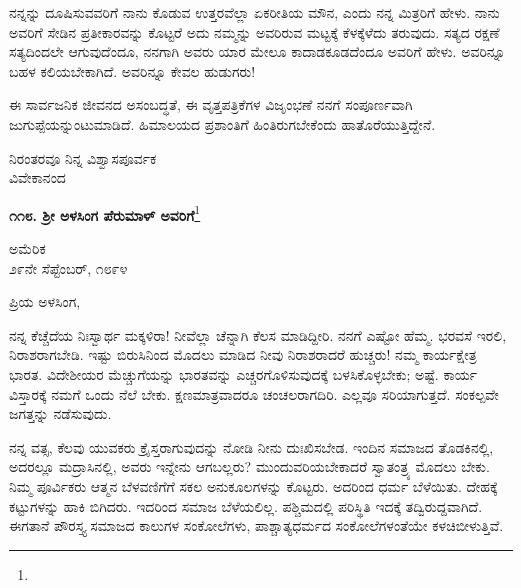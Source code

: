 ನನ್ನನ್ನು ದೂಷಿಸುವವರಿಗೆ ನಾನು ಕೊಡುವ ಉತ್ತರವೆಲ್ಲಾ ಏಕರೀತಿಯ ಮೌನ, ಎಂದು ನನ್ನ ಮಿತ್ರರಿಗೆ ಹೇಳು. ನಾನು ಅವರಿಗೆ ಸೇಡಿನ ಪ್ರತೀಕಾರವನ್ನು ಕೊಟ್ಟರೆ ಅದು ನಮ್ಮನ್ನು ಅವರಿರುವ ಮಟ್ಟಕ್ಕೆ ಕೆಳಕ್ಕೆಳೆದು ತರುವುದು. ಸತ್ಯದ ರಕ್ಷಣೆ ಸತ್ಯದಿಂದಲೇ ಆಗುವುದೆಂದೂ, ನನಗಾಗಿ ಅವರು ಯಾರ ಮೇಲೂ ಕಾದಾಡಕೂಡದೆಂದೂ ಅವರಿಗೆ ಹೇಳು. ಅವರಿನ್ನೂ ಬಹಳ ಕಲಿಯಬೇಕಾಗಿದೆ. ಅವರಿನ್ನೂ ಕೇವಲ ಹುಡುಗರು!

ಈ ಸಾರ್ವಜನಿಕ ಜೀವನದ ಅಸಂಬದ್ಧತೆ, ಈ ವೃತ್ತಪತ್ರಿಕೆಗಳ ವಿಜೃಂಭಣೆ ನನಗೆ ಸಂಪೂರ್ಣವಾಗಿ ಜುಗುಪ್ಪೆಯನ್ನುಂಟುಮಾಡಿದೆ. ಹಿಮಾಲಯದ ಪ್ರಶಾಂತಿಗೆ ಹಿಂತಿರುಗಬೇಕೆಂದು ಹಾತೊರೆಯುತ್ತಿದ್ದೇನೆ.

\vspace{-0.5cm}

{\flushright
ನಿರಂತರವೂ ನಿನ್ನ ವಿಶ್ವಾಸಪೂರ್ವಕ\\ವಿವೇಕಾನಂದ\par}

\begin{center}
\textbf{೧೧೮. ಶ‍್ರೀ ಅಳಸಿಂಗ ಪೆರುಮಾಳ್ ಅವರಿಗೆ}\footnote{}
\end{center}

\vspace{-0.5cm}

\begin{flushright}
ಅಮೆರಿಕ\\೨೯ನೇ ಸೆಪ್ಟೆಂಬರ್, ೧೮೯೪
\end{flushright}

\vspace{-0.5cm}

\noindent
ಪ್ರಿಯ ಅಳಸಿಂಗ,

ನನ್ನ ಕೆಚ್ಚೆದೆಯ ನಿಃಸ್ವಾರ್ಥ ಮಕ್ಕಳಿರಾ! ನೀವೆಲ್ಲಾ ಚೆನ್ನಾಗಿ ಕೆಲಸ ಮಾಡಿದ್ದೀರಿ. ನನಗೆ ಎಷ್ಟೋ ಹೆಮ್ಮ. ಭರವಸೆ ಇರಲಿ, ನಿರಾಶರಾಗಬೇಡಿ. ಇಷ್ಟು ಬಿರುಸಿನಿಂದ ಮೊದಲು ಮಾಡಿದ ನೀವು ನಿರಾಶರಾದರೆ ಹುಚ್ಚರು! ನಮ್ಮ ಕಾರ್ಯಕ್ಷೇತ್ರ ಭಾರತ. ವಿದೇಶೀಯರ ಮೆಚ್ಚುಗೆಯನ್ನು ಭಾರತವನ್ನು ಎಚ್ಚರಗೊಳಿಸುವುದಕ್ಕೆ ಬಳಸಿಕೊಳ್ಳಬೇಕು; ಅಷ್ಟೆ. ಕಾರ್ಯ ವಿಸ್ತಾರಕ್ಕೆ ನಮಗೆ ಒಂದು ನೆಲೆ ಬೇಕು. ಕ್ಷಣಮಾತ್ರವಾದರೂ ಚಂಚಲರಾಗದಿರಿ. ಎಲ್ಲವೂ ಸರಿಯಾಗುತ್ತದೆ. ಸಂಕಲ್ಪವೇ ಜಗತ್ತನ್ನು ನಡೆಸುವುದು.

ನನ್ನ ವತ್ಸ, ಕೆಲವು ಯುವಕರು ಕ್ರೈಸ್ತರಾಗುವುದನ್ನು ನೋಡಿ ನೀನು ದುಃಖಿಸಬೇಡ. ಇಂದಿನ ಸಮಾಜದ ತೊಡಕಿನಲ್ಲಿ, ಅದರಲ್ಲೂ ಮದ್ರಾಸಿನಲ್ಲಿ, ಅವರು ಇನ್ನೇನು ಆಗಬಲ್ಲರು? ಮುಂದುವರಿಯಬೇಕಾದರೆ ಸ್ವಾತಂತ್ರ್ಯ ಮೊದಲು ಬೇಕು. ನಿಮ್ಮ ಪೂರ್ವಿಕರು ಆತ್ಮನ ಬೆಳವಣಿಗೆಗೆ ಸಕಲ ಅನುಕೂಲಗಳನ್ನು ಕೊಟ್ಟರು. ಅದರಿಂದ ಧರ್ಮ ಬೆಳೆಯಿತು. ದೇಹಕ್ಕೆ ಕಟ್ಟುಗಳನ್ನು ಹಾಕಿ ಬಿಗಿದರು. ಇದರಿಂದ ಸಮಾಜ ಬೆಳೆಯಲಿಲ್ಲ. ಪಶ್ಚಿಮದಲ್ಲಿ ಪರಿಸ್ಥಿತಿ ಇದಕ್ಕೆ ತದ್ವಿರುದ್ದವಾಗಿದೆ. ಈಗತಾನೆ ಪೌರಸ್ತ್ಯ ಸಮಾಜದ ಕಾಲುಗಳ ಸಂಕೋಲೆಗಳು, ಪಾಶ್ಚಾತ್ಯಧರ್ಮದ ಸಂಕೋಲೆಗಳಂತೆಯೇ ಕಳಚಿಬೀಳುತ್ತಿವೆ.


